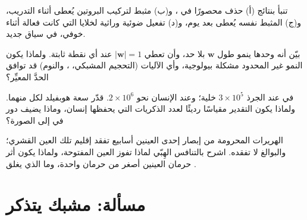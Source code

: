\begin{exercise}[$\star\star$]\label{exo:b3:learning-memory:9}
تنبأ بنتائج (أ) حذف  محصورًا في ، و(ب) مثبط
لتركيب البروتين يُعطى أثناء التدريب، و(ج) المثبط نفسه يُعطى
بعد يوم، و(د)  تفعيل ضوئية وراثية لخلايا  التي كانت فعالة أثناء  خوفي، في سياق جديد.
\end{exercise}

\begin{exercise}[$\star\star\star$]\label{exo:b3:learning-memory:10}
بيّن أنه  وحدها ينمو طول $\mathbf{w}$ بلا حد، وأن
 تعطي $|\mathbf{w}| = 1$ عند أي نقطة ثابتة. ولماذا
يكون النمو غير المحدود مشكلة بيولوجية، وأي الآليات (التحجيم
المشبكي، ، والنوم) قد توافق الحدَّ
المعيِّر؟
\end{exercise}

\begin{exercise}[$\star\star\star$]\label{exo:b3:learning-memory:11}
في  عند الجرذ $3\times 10^{5}$ خلية؛ وعند الإنسان نحو $2\times 10^{6}$.
قدّر سعة هوبفيلد لكل منهما. ولماذا يكون التقدير مقياسًا
رديئًا لعدد الذكريات التي يحفظها إنسان، وماذا يضيف دور
 في  إلى الصورة؟
\end{exercise}

\begin{exercise}[$\star\star\star$]\label{exo:b3:learning-memory:12}
الهريرات المحرومة من إبصار إحدى العينين أسابيع تفقد إقليم
تلك العين القشري؛ والبوالغ لا تفقده. اشرح بالتنافس الهِبّي
لماذا تفوز العين المفتوحة، ولماذا يكون أثر حرمان العينين
أصغر من حرمان واحدة، وما الذي يغلق .
\end{exercise}

\section{مسألة: مشبك يتذكر}

